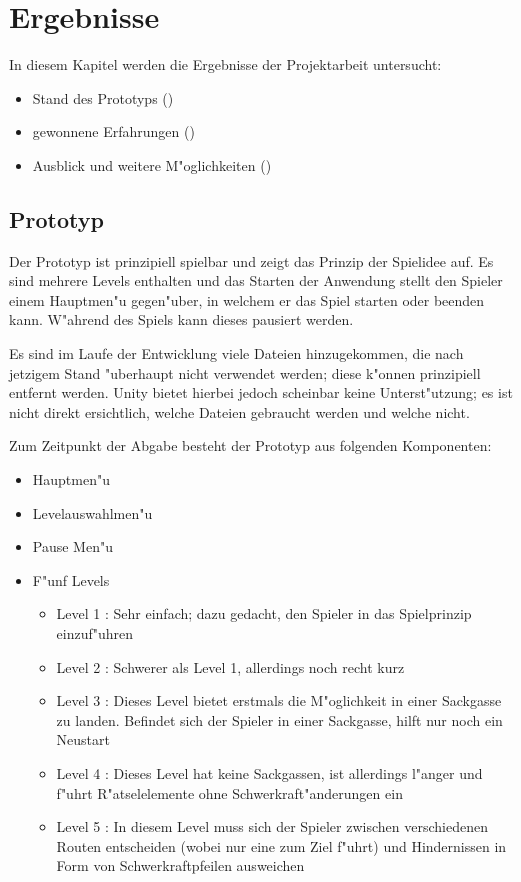 \section{Ergebnisse}
\label{sec:results}
%
In diesem Kapitel werden die Ergebnisse der Projektarbeit untersucht:
\begin{itemize}
	\item
		Stand des Prototyps ()
	\item
		gewonnene Erfahrungen ()
	\item
		Ausblick und weitere M"oglichkeiten ()
\end{itemize}
%
\subsection{Prototyp}
\label{sec:results/prototype}
%
Der Prototyp ist prinzipiell spielbar und zeigt das Prinzip der
Spielidee auf. Es sind mehrere Levels enthalten und das Starten
der Anwendung stellt den Spieler einem Hauptmen"u gegen"uber, in
welchem er das Spiel starten oder beenden kann. W"ahrend des Spiels
kann dieses pausiert werden.

Es sind im Laufe der Entwicklung viele Dateien hinzugekommen, die
nach jetzigem Stand "uberhaupt nicht verwendet werden; diese k"onnen
prinzipiell entfernt werden. Unity bietet hierbei jedoch scheinbar
keine Unterst"utzung; es ist nicht direkt ersichtlich, welche
Dateien gebraucht werden und welche nicht.

Zum Zeitpunkt der Abgabe besteht der Prototyp aus folgenden Komponenten:

\begin{itemize}
	\item Hauptmen"u
	\item Levelauswahlmen"u
	\item Pause Men"u
	\item F"unf Levels
	\begin{itemize}
		\item Level 1 : Sehr einfach; dazu gedacht, den Spieler in das Spielprinzip einzuf"uhren
		\item Level 2 : Schwerer als Level 1, allerdings noch recht kurz
		\item Level 3 : Dieses Level bietet erstmals die M"oglichkeit in einer Sackgasse zu landen.
			Befindet sich der Spieler in einer Sackgasse, hilft nur noch ein Neustart
		\item Level 4 : Dieses Level hat keine Sackgassen, ist allerdings l"anger und f"uhrt
			R"atselelemente ohne Schwerkraft"anderungen ein
		\item Level 5 : In diesem Level muss sich der Spieler zwischen verschiedenen Routen
			entscheiden (wobei nur eine zum Ziel f"uhrt) und Hindernissen in Form von
			Schwerkraftpfeilen ausweichen
	\end{itemize}
\end{itemize}

